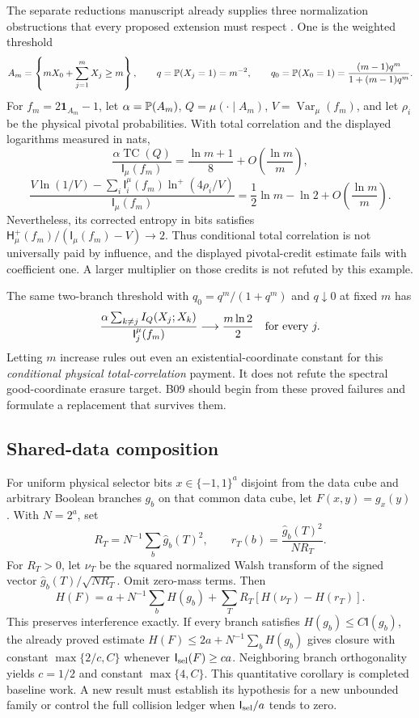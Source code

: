 \documentclass[11pt]{article}
\newcommand{\HH}{\mathsf H}\newcommand{\I}{\mathsf I}
\newcommand{\Var}{\operatorname{Var}}\newcommand{\wh}[1]{\widehat{#1}}
\newcommand{\bits}{\{-1,1\}}\newcommand{\KL}{\operatorname{D}}
\begin{document}
The separate reductions manuscript already supplies three
normalization obstructions that every proposed extension must
respect \cite{Reductions}. One is the weighted threshold
\[
 A_m=\left\{mX_0+\sum_{j=1}^mX_j\ge m\right\},\qquad
 q=\mathbb P(X_j=1)=m^{-2},\qquad
 q_0=\mathbb P(X_0=1)=\frac{(m-1)q^m}{1+(m-1)q^m}.
\]
For $f_m=2\mathbf1_{A_m}-1$, let
$\alpha=\mathbb P(A_m)$, $Q=\mu(\cdot\mid A_m)$,
$V=\Var_\mu(f_m)$, and let $\rho_i$ be the physical pivotal
probabilities. With total correlation and the displayed
logarithms measured in nats,
\[
 \frac{\alpha\operatorname{TC}(Q)}{\I_\mu(f_m)}
 =\frac{\ln m+1}{8}+O\!\left(\frac{\ln m}{m}\right),
\]
\[
 \frac{V\ln(1/V)-\sum_i\I_i^\mu(f_m)
                    \ln^+(4\rho_i/V)}{\I_\mu(f_m)}
 =\frac12\ln m-\ln2+O\!\left(\frac{\ln m}{m}\right).
\]
Nevertheless, its corrected entropy in bits satisfies
$\HH_\mu^+(f_m)/(\I_\mu(f_m)-V)\to2$.
Thus conditional total correlation is not universally paid by
influence, and the displayed pivotal-credit estimate fails with
coefficient one. A larger multiplier on those credits is not
refuted by this example.

The same two-branch threshold with
$q_0=q^m/(1+q^m)$ and $q\downarrow0$ at fixed $m$ has
\[
 \frac{\alpha\sum_{k\ne j}I_Q(X_j;X_k)}
      {\I_j^\mu(f_m)}\longrightarrow\frac{m\ln2}{2}
 \quad\hbox{for every }j.
\]
Letting $m$ increase rules out even an existential-coordinate
constant for this \emph{conditional physical total-correlation}
payment. It does not refute the spectral good-coordinate
erasure target. B09 should begin from these proved failures
and formulate a replacement that survives them.

\subsection{Shared-data composition}

For uniform physical selector bits $x\in\bits^a$ disjoint from the data cube and arbitrary Boolean branches $g_b$ on that common data cube, let $F(x,y)=g_x(y)$. With $N=2^a$, set
\[
 R_T=N^{-1}\sum_b\wh g_b(T)^2,\qquad
 r_T(b)=\frac{\wh g_b(T)^2}{NR_T}.
\]
For $R_T>0$, let $\nu_T$ be the squared normalized Walsh transform of the signed vector $\wh g_b(T)/\sqrt{NR_T}$. Omit zero-mass terms. Then
\[
 H(F)=a+N^{-1}\sum_bH(g_b)
       +\sum_T R_T[H(\nu_T)-H(r_T)].
\]
This preserves interference exactly. If every branch satisfies
$H(g_b)\le C\I(g_b)$, the already proved estimate
$H(F)\le2a+N^{-1}\sum_bH(g_b)$ gives closure with constant
$\max\{2/c,C\}$ whenever $\I_{\rm sel}(F)\ge ca$.
Neighboring branch orthogonality yields $c=1/2$ and constant
$\max\{4,C\}$. This quantitative corollary is completed baseline
work. A new result must establish its hypothesis for a new
unbounded family or control the full collision ledger when
$\I_{\rm sel}/a$ tends to zero.
\end{document}
